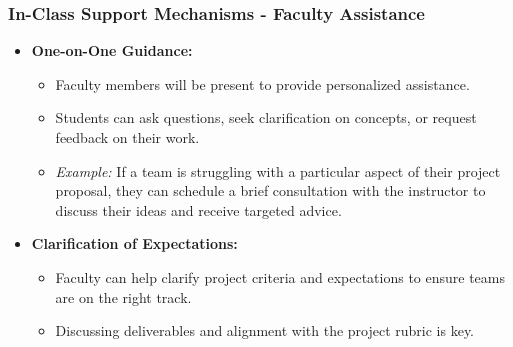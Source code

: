 \documentclass[aspectratio=169]{beamer}
\begin{document}
\begin{frame}[fragile]
    \frametitle{In-Class Support Mechanisms - Faculty Assistance}
    \begin{itemize}
        \item \textbf{One-on-One Guidance:}
            \begin{itemize}
                \item Faculty members will be present to provide personalized assistance. 
                \item Students can ask questions, seek clarification on concepts, or request feedback on their work.
                \item \textit{Example:} If a team is struggling with a particular aspect of their project proposal, they can schedule a brief consultation with the instructor to discuss their ideas and receive targeted advice.
            \end{itemize}
        
        \item \textbf{Clarification of Expectations:}
            \begin{itemize}
                \item Faculty can help clarify project criteria and expectations to ensure teams are on the right track.
                \item Discussing deliverables and alignment with the project rubric is key.
            \end{itemize}
    \end{itemize}
\end{frame}
\end{document}
